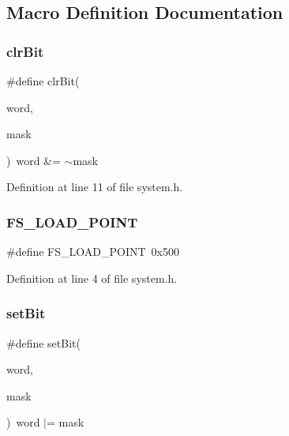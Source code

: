 \subsection{Macro Definition Documentation}
\mbox{\label{a00134_ab6ca194e33920928b4bdeff67bf0edec_ab6ca194e33920928b4bdeff67bf0edec}} 
\subsubsection{\texorpdfstring{clr\+Bit}{clrBit}}
{\footnotesize\ttfamily \#define clr\+Bit(\begin{DoxyParamCaption}\item[{}]{word,  }\item[{}]{mask }\end{DoxyParamCaption})~word \&= $\sim$mask}



Definition at line 11 of file system.\+h.

\mbox{\label{a00134_ade5f4f9306a7cacc0cb2a518bd97e237_ade5f4f9306a7cacc0cb2a518bd97e237}} 
\subsubsection{\texorpdfstring{F\+S\+\_\+\+L\+O\+A\+D\+\_\+\+P\+O\+I\+NT}{FS\_LOAD\_POINT}}
{\footnotesize\ttfamily \#define F\+S\+\_\+\+L\+O\+A\+D\+\_\+\+P\+O\+I\+NT~0x500}



Definition at line 4 of file system.\+h.

\mbox{\label{a00134_a3c47e49052cc52d10755358512c10135_a3c47e49052cc52d10755358512c10135}} 
\subsubsection{\texorpdfstring{set\+Bit}{setBit}}
{\footnotesize\ttfamily \#define set\+Bit(\begin{DoxyParamCaption}\item[{}]{word,  }\item[{}]{mask }\end{DoxyParamCaption})~word $\vert$= mask}



